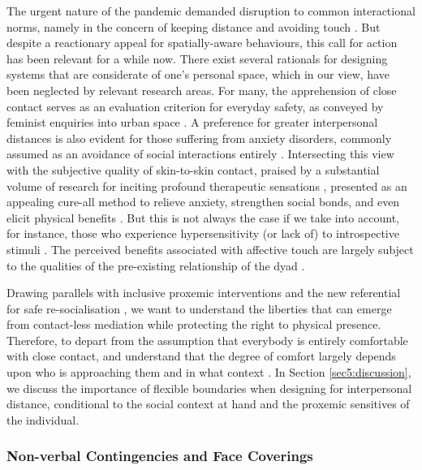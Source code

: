 The urgent nature of the pandemic demanded disruption to common interactional norms, namely in the concern of keeping distance and avoiding touch \citep{long_covid-19_2021,katila_interaction_2020}. But despite a reactionary appeal for spatially-aware behaviours, this call for action has been relevant for a while now. There exist several rationals for designing systems that are considerate of one's personal space, which in our view, have been neglected by relevant research areas. For many, the apprehension of close contact serves as an evaluation criterion for everyday safety, as conveyed by feminist enquiries into urban space \citep{farina_moving_2021,peimani_where_2016}. A preference for greater interpersonal distances is also evident for those suffering from anxiety disorders, commonly assumed as an avoidance of social interactions entirely \citep{givon-benjio_biased_2020}. Intersecting this view with the subjective quality of skin-to-skin contact, praised by a substantial volume of research for inciting profound therapeutic sensations \citep{crucianelli_developmental_2020}, presented as an appealing cure-all method to relieve anxiety, strengthen social bonds, and even elicit physical benefits \citep{field_touch_2010,peterson_parents_2007,dolin_reach_1993}. But this is not always the case if we take into account, for instance, those who experience hypersensitivity (or lack of) to introspective stimuli \citep{bischoff-grethe_neural_2018,sivik_alexithymia_1993}. The perceived benefits associated with affective touch are largely subject to the qualities of the pre-existing relationship of the dyad \citep{gulledge2007non}.

Drawing parallels with inclusive proxemic interventions and the new referential for safe re-socialisation \citep{long_covid-19_2021}, we want to understand the liberties that can emerge from contact-less mediation while protecting the right to physical presence. Therefore, to depart from the assumption that everybody is entirely comfortable with close contact, and understand that the degree of comfort largely depends upon who is approaching them and in what context \citep{matsumoto_gender_2016,suvilehto_topography_2015}. In Section \ref{sec5:discussion}, we discuss the importance of flexible boundaries when designing for interpersonal distance, conditional to the social context at hand and the proxemic sensitives of the individual.

\subsubsection{Non-verbal Contingencies and Face Coverings}
\label{subsev:face_coverings}

